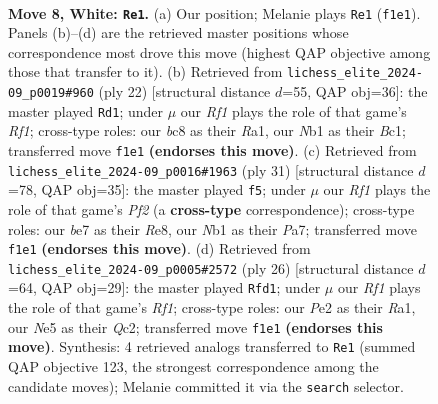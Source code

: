 \documentclass[11pt]{article}
\begin{document}
\begin{figure}[p]\centering
\begin{subfigure}{0.46\textwidth}\centering
\resizebox{\linewidth}{!}{%
\newchessgame
\chessboard[
  setfen={rnbq1rk1/ppp1bppp/4p3/3nN3/2pP4/6P1/PP2PPBP/RNBQ1RK1 w - - 2 8},
  showmover=false,
  pgfstyle=straightmove, color=movearrow, markmove={f1-e1}
]}
\caption{}
\end{subfigure}\hfill
\begin{subfigure}{0.46\textwidth}\centering
\resizebox{\linewidth}{!}{%
\newchessgame
\chessboard[
  setfen={r2qbrk1/pp2bppp/2p1pn2/4N3/3P4/6P1/PPP1QPBP/R1B2RK1 w - - 4 12},
  showmover=false,
  pgfstyle=straightmove, color=movearrow, markmove={f1-d1}
]}
\caption{}
\end{subfigure}
\\[4pt]
\begin{subfigure}{0.46\textwidth}\centering
\resizebox{\linewidth}{!}{%
\newchessgame
\chessboard[
  setfen={r3r1k1/ppq2ppp/2nbp3/3p4/3Pn3/2P2N1P/PP2BPP1/R1BQR1K1 b - - 1 16},
  showmover=false,
  pgfstyle=straightmove, color=movearrow, markmove={f7-f5}
]}
\caption{}
\end{subfigure}\hfill
\begin{subfigure}{0.46\textwidth}\centering
\resizebox{\linewidth}{!}{%
\newchessgame
\chessboard[
  setfen={r2r2k1/pppbqpp1/4p2p/n3N3/1bpPN3/4P3/PPQ1BPPP/R4RK1 w - - 8 14},
  showmover=false,
  pgfstyle=straightmove, color=movearrow, markmove={f1-d1}
]}
\caption{}
\end{subfigure}
\caption{\textbf{Move 8, White: \texttt{Re1}.} (a) Our position; Melanie plays \texttt{Re1} (\texttt{f1e1}). Panels (b)--(d) are the retrieved master positions whose correspondence most drove this move (highest QAP objective among those that transfer to it). (b) Retrieved from \texttt{lichess\_elite\_2024-09\_p0019\#960} (ply 22) [structural distance $d$=55, QAP obj=36]: the master played \texttt{Rd1}; under $\mu$ our \emph{Rf1} plays the role of that game's \emph{Rf1}; cross-type roles: our \emph{b}c8 as their \emph{R}a1, our \emph{N}b1 as their \emph{B}c1; transferred move \texttt{f1e1} \textbf{(endorses this move)}. (c) Retrieved from \texttt{lichess\_elite\_2024-09\_p0016\#1963} (ply 31) [structural distance $d$=78, QAP obj=35]: the master played \texttt{f5}; under $\mu$ our \emph{Rf1} plays the role of that game's \emph{Pf2} (a \textbf{cross-type} correspondence); cross-type roles: our \emph{b}e7 as their \emph{R}e8, our \emph{N}b1 as their \emph{P}a7; transferred move \texttt{f1e1} \textbf{(endorses this move)}. (d) Retrieved from \texttt{lichess\_elite\_2024-09\_p0005\#2572} (ply 26) [structural distance $d$=64, QAP obj=29]: the master played \texttt{Rfd1}; under $\mu$ our \emph{Rf1} plays the role of that game's \emph{Rf1}; cross-type roles: our \emph{P}e2 as their \emph{R}a1, our \emph{N}e5 as their \emph{Q}c2; transferred move \texttt{f1e1} \textbf{(endorses this move)}. Synthesis: 4 retrieved analogs transferred to \texttt{Re1} (summed QAP objective 123, the strongest correspondence among the candidate moves); Melanie committed it via the \texttt{search} selector.}
\label{fig:thought-m14}
\end{figure}
\end{document}
